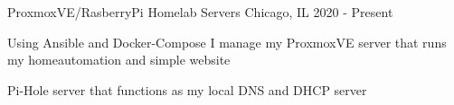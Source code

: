 

\begin{cventries}

  \cventry
    {ProxmoxVE/RasberryPi} %
    {Homelab Servers} %
    {Chicago, IL} %
    {2020 - Present} %
    {
      \begin{cvitems} %
      \item {Using Ansible and Docker-Compose I manage my ProxmoxVE server that runs my homeautomation and simple website}
      \item {Pi-Hole server that functions as my local DNS and DHCP server}
      \end{cvitems}
    }

\end{cventries}
